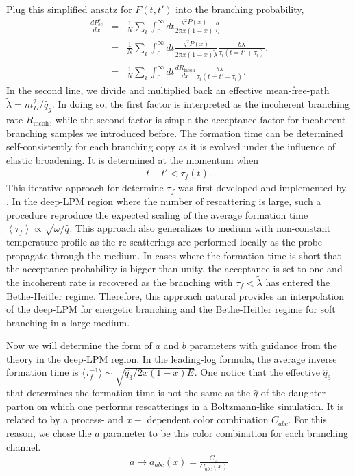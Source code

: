 Plug this simplified ansatz for $F(t, t')$ into the branching probability,
\begin{eqnarray}
\frac{dP^{a}_{bc}}{dx} &=& \frac{1}{N}\sum_i \int_0^\infty dt \frac{g^2 P(x)}{2\pi x (1-x)} \frac{b}{\tau_i} \\  
 &=& \frac{1}{N}\sum_i \int_0^\infty dt \frac{g^2 P(x)}{2\pi x (1-x) \tilde{\lambda}} \frac{b \tilde{\lambda}}{\tau_i(t=t'+\tau_i)}.\\
  &=& \frac{1}{N}\sum_i \int_0^\infty dt \frac{dR_{\textrm{incoh}}}{dx} \frac{b \tilde{\lambda}}{\tau_i(t=t'+\tau_i)}.
\end{eqnarray}
In the second line, we divide and multiplied back an effective mean-free-path $\tilde{\lambda} = m_D^2/\hat{q}_g$.
In doing so, the first factor is interpreted as the incoherent branching rate $R_{\textrm{incoh}}$, while the second factor is simple the acceptance factor for incoherent branching samples we introduced before.
The formation time can be determined self-consistently for each branching copy as it is evolved under the influence of elastic broadening.
It is determined at the momentum when
\begin{eqnarray}
t - t' < \tau_f(t). 
\end{eqnarray}
This iterative approach for determine $\tau_f$ was first developed and implemented by \cite{Zapp:2011ya}.
In the deep-LPM region where the number of rescattering is large, such a procedure reproduce the expected scaling of the average formation time $\left\langle\tau_f\right\rangle \propto \sqrt{\omega/\hat{q}}$.
This approach also generalizes to medium with non-constant temperature profile as the re-scatterings are performed locally as the probe propagate through the medium.
In cases where the formation time is short that the acceptance probability is bigger than unity, the acceptance is set to one and the incoherent rate is recovered as the branching with $\tau_f < \tilde{\lambda}$ has entered the Bethe-Heitler regime.
Therefore, this approach natural provides an interpolation of the deep-LPM for energetic branching and the Bethe-Heitler regime for soft branching in a large medium.


Now we will determine the form of $a$ and $b$ parameters with guidance from the theory in the deep-LPM region.
In the leading-log formula, the average inverse formation time is $\langle\tau_f^{-1}\rangle \sim \sqrt{\hat{q}_3 / 2x(1-x)E}$. 
One notice that the effective $\hat{q}_3$ that determines the formation time is not the same as the $\hat{q}$ of the daughter parton on which one performs rescatterings in a Boltzmann-like simulation.
It is related to by a process- and $x-$ dependent color combination $C_{abc}$.
For this reason, we chose the $a$ parameter to be this color combination for each branching channel.
\begin{eqnarray}
a \rightarrow a_{abc}(x) = \frac{C_A}{C_{abc}(x)}
\end{eqnarray}

